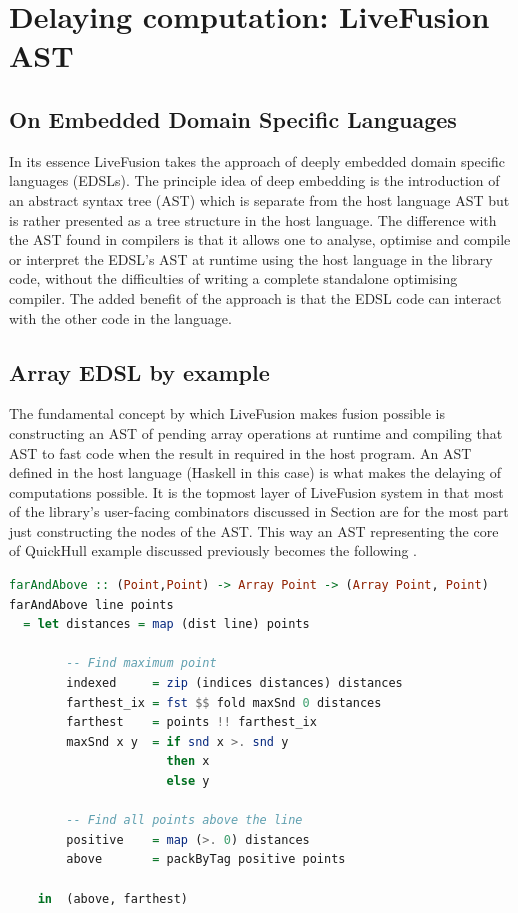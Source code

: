 \documentclass[preamble.tex]{subfiles}
\begin{document}
\clearpage

\chapter{Delaying computation: LiveFusion AST}

\section{On Embedded Domain Specific Languages}
In its essence LiveFusion takes the approach of deeply embedded domain specific languages (EDSLs). The principle idea of deep embedding is the introduction of an abstract syntax tree (AST) which is separate from the host language AST but is rather presented as a tree structure in the host language. The difference with the AST found in compilers is that it allows one to analyse, optimise and compile or interpret the EDSL's AST at runtime using the host language in the library code, without the difficulties of writing a complete standalone optimising compiler. The added benefit of the approach is that the EDSL code can interact with the other code in the language. 

\section{Array EDSL by example}
The fundamental concept by which LiveFusion makes fusion possible is constructing an AST of pending array operations at runtime and compiling that AST to fast code when the result in required in the host program. An AST defined in the host language (Haskell in this case) is what makes the delaying of computations possible. It is the topmost layer of LiveFusion system in that most of the library's user-facing combinators discussed in Section  are for the most part just constructing the nodes of the AST. This way an AST representing the core of QuickHull example discussed previously becomes the following .

\begin{lstlisting}[basicstyle={\ttfamily},language=Haskell]
farAndAbove :: (Point,Point) -> Array Point -> (Array Point, Point)
farAndAbove line points
  = let distances = map (dist line) points

        -- Find maximum point
        indexed     = zip (indices distances) distances
        farthest_ix = fst $$ fold maxSnd 0 distances
        farthest    = points !! farthest_ix
        maxSnd x y  = if snd x >. snd y
                      then x
                      else y

        -- Find all points above the line
        positive    = map (>. 0) distances
        above       = packByTag positive points

    in  (above, farthest)
\end{lstlisting}
\end{document}
